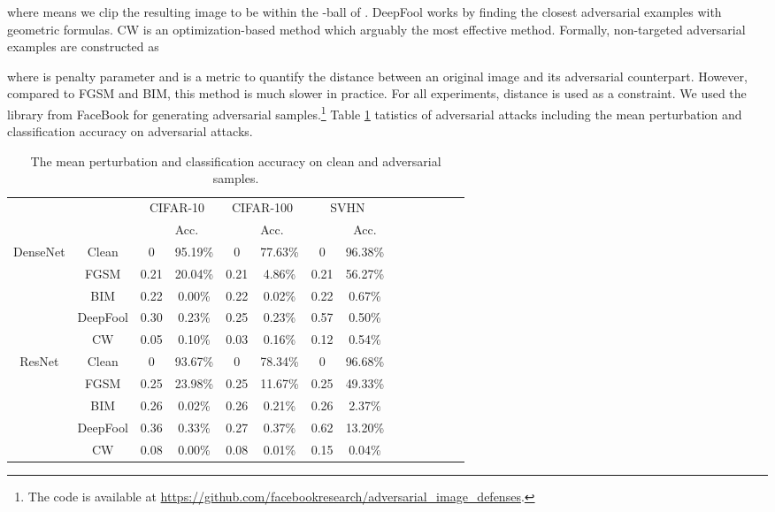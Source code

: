 \documentclass{article}
\begin{document}
where  means we clip the resulting image to be within the -ball of .
DeepFool works by finding the closest adversarial examples with geometric formulas. CW is an optimization-based method which arguably the most effective method.
Formally, non-targeted adversarial examples are constructed as

where  is penalty parameter and  is a metric to quantify the distance between an original image and its adversarial counterpart.
However, compared
to FGSM and BIM, this method is much slower in practice.
For all experiments,  distance is used as a constraint. We used the library from FaceBook \citep{guo2017countering} for generating adversarial samples.\footnote{The code is available at \url{https://github.com/facebookresearch/adversarial_image_defenses}.} Table \ref{tbl:adv_static} tatistics of adversarial attacks including the  mean perturbation and classification accuracy on adversarial attacks.


\begin{table}[t]
\centering
\begin{tabular}{cc|cccccccccccc}
\toprule
 & & \multicolumn{2}{c|}{CIFAR-10} & \multicolumn{2}{c|}{CIFAR-100} & \multicolumn{2}{c}{SVHN}\\
&     &  & \multicolumn{1}{l|}{Acc.} &  & \multicolumn{1}{l|}{Acc.} &      & Acc.    \\ \midrule
\multirow{5}{*}{DenseNet} &Clean   
& 0 & \multicolumn{1}{c|}{95.19\%}  
& 0 & \multicolumn{1}{c|}{77.63\%}  
& 0 & 96.38\%      
\\ 
&FGSM
& 0.21  & \multicolumn{1}{c|}{20.04\%}  
& 0.21 & \multicolumn{1}{c|}{4.86\%}  
& 0.21 & 56.27\%   
\\
&BIM
& 0.22 & \multicolumn{1}{c|}{0.00\%}  
& 0.22 & \multicolumn{1}{c|}{0.02\%}  
& 0.22 & 0.67\%      
\\
&DeepFool 
& 0.30 & \multicolumn{1}{c|}{0.23\%}  
& 0.25 & \multicolumn{1}{c|}{0.23\%}  
& 0.57 & 0.50\%       
\\
&CW 
& 0.05 & \multicolumn{1}{c|}{0.10\%}  
& 0.03 & \multicolumn{1}{c|}{0.16\%}  
& 0.12 &  0.54\%
\\\midrule
\multirow{5}{*}{ResNet} &Clean   
& 0  & \multicolumn{1}{c|}{93.67\%}  
& 0  & \multicolumn{1}{c|}{78.34\%}  
& 0  & 96.68\%
\\ 
&FGSM
& 0.25  & \multicolumn{1}{c|}{23.98\%}  
& 0.25 & \multicolumn{1}{c|}{11.67\%}  
& 0.25 & 49.33\%
\\
&BIM
& 0.26 & \multicolumn{1}{c|}{0.02\%}  
& 0.26  & \multicolumn{1}{c|}{0.21\%}  
& 0.26 & 2.37\%  
\\
&DeepFool 
& 0.36 & \multicolumn{1}{c|}{0.33\%}  
& 0.27 & \multicolumn{1}{c|}{0.37\%}  
& 0.62 &  13.20\%     
\\
&CW 
& 0.08  & \multicolumn{1}{c|}{0.00\%}  
& 0.08 & \multicolumn{1}{c|}{0.01\%}  
& 0.15 & 0.04\% 
\\\bottomrule
\end{tabular}
\vspace{0.1in}
\caption{The  mean perturbation and classification accuracy on clean and adversarial samples.}
\label{tbl:adv_static}
\end{table}
\end{document}

